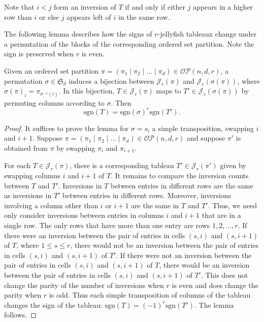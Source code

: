\documentclass[ALCO, Unicode]{cedram}
\numberwithin{equation}{section}
\newcommand{\rstab}{\mathcal{J}}
\newcommand{\sgn}{\mathrm{sgn}}
\newcommand{\ordsetpart}{\mathcal{OP}}
\begin{document}
Note that $i < j$ form an inversion of $T$ if and only if either $j$ appears in a higher row than $i$ or else $j$ appears left of $i$ in the same row.

The following lemma describes how the signs of $r$-jellyfish tableaux change under a permutation of the blocks of the corresponding ordered set partition. Note the sign is preserved when $r$ is even.

\begin{lemma}\label{lem:colswap}
Given an ordered set partition $\pi=(\pi_1\mid \pi_2\mid \ldots\mid \pi_d)\in\ordsetpart(n,d,r)$, a permutation $\sigma\in \mathfrak{S}_d$ induces a bijection between $\rstab_r(\pi)$ and $\rstab_r(\sigma(\pi))$, where $\sigma(\pi)_i = \pi_{\sigma^{-1}(i)}$. In this bijection,
$T\in\rstab_r(\pi)$ maps to $T'\in\rstab_r(\sigma(\pi))$ by permuting columns according to $\sigma$. Then \[\sgn(T)=\sgn(\sigma)^r\sgn(T').\]
\end{lemma}
\begin{proof}
It suffices to prove the lemma for $\sigma = s_i$ a simple transposition, swapping $i$ and $i+1$.
Suppose $\pi=(\pi_1\mid \pi_2\mid \ldots\mid \pi_d)\in\ordsetpart(n,d,r)$ and suppose $\pi'$ is obtained from $\pi$ by swapping $\pi_i$ and $\pi_{i+1}$. 

For each $T\in\rstab_r(\pi)$, there is a corresponding tableau $T'\in\rstab_r(\pi')$ given by swapping columns $i$ and $i+1$ of $T$. It remains to compare the inversion counts between $T$ and $T'$. Inversions in $T$ between entries in different rows are the same as inversions in $T'$ between entries in different rows. 
Moreover, inversions involving a column other than $i$ or $i+1$ are the same in $T$ and $T'$.
Thus, we need only consider inversions between entries in columns $i$ and $i+1$ that are in a single row. The only rows that have more than one entry are rows $1,2,\ldots,r$. If there were an inversion between the pair of entries in cells $(s,i)$ and $(s,i+1)$ of $T$,  where $1\leq s \leq r$, there would not be an inversion between the pair of entries in cells $(s,i)$ and $(s,i+1)$ of $T'$. If there were not an inversion between the pair of entries in cells $(s,i)$ and $(s,i+1)$ of $T$, there would be an inversion between the pair of entries in cells $(s,i)$ and $(s,i+1)$ of $T'$. This does not change the parity of the number of inversions when $r$ is even and does change the parity when $r$ is odd. Thus each simple transposition of columns of the tableau changes the sign of the tableau: ${\sgn(T)}=(-1)^r{\sgn(T')}$. The lemma follows.
\end{proof}
\end{document}
